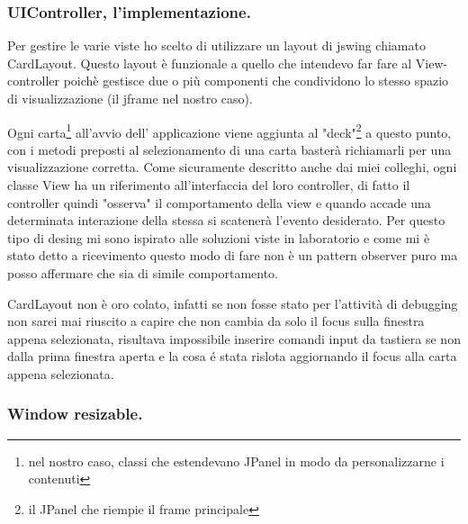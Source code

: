 \documentclass[a4paper,12pt]{report}
\begin{document}
\subsubsection{UIController, l'implementazione.}
Per gestire le varie viste ho scelto di utilizzare un layout di jswing chiamato CardLayout.
Questo layout è funzionale a quello che intendevo far fare al View-controller poichè
gestisce due o più componenti che condividono lo stesso spazio di visualizzazione (il jframe nel nostro caso).

Ogni carta\footnote{nel nostro caso, classi che estendevano JPanel in modo da personalizzarne i contenuti}
all'avvio dell' applicazione viene aggiunta al "deck"\footnote{il JPanel che riempie il frame principale}
a questo punto, con i metodi preposti al selezionamento di una carta basterà richiamarli per una visualizzazione
corretta.
Come sicuramente descritto anche dai miei colleghi, ogni classe View ha un riferimento all'interfaccia
del loro controller, di fatto il controller quindi "osserva" il comportamento della view e quando accade una
determinata interazione della stessa si scatenerà l'evento desiderato.
Per questo tipo di desing mi sono ispirato alle soluzioni viste in laboratorio e come mi è stato detto
a ricevimento questo modo di fare non è un pattern observer puro ma posso affermare che sia di simile
comportamento.

CardLayout non è oro colato, infatti se non fosse stato per l'attività di debugging non sarei mai riuscito
a capire che non cambia da solo il focus sulla finestra appena selezionata, risultava impossibile
inserire comandi input da tastiera se non dalla prima finestra aperta e la cosa é stata rislota
aggiornando il focus alla carta appena selezionata.\\

\subsubsection{Window resizable.}
\end{document}
